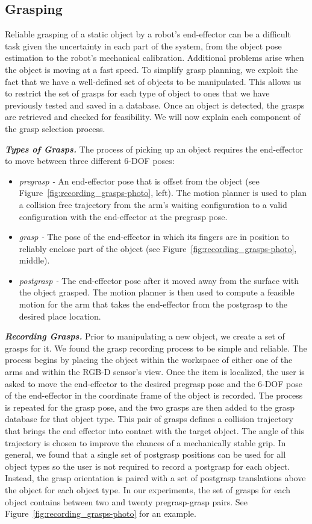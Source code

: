 \documentclass[letterpaper, 10 pt, conference]{ieeeconf}  %
\begin{document}
\subsection{Grasping}

Reliable grasping of a static object by a robot's end-effector can be
a difficult task given the uncertainty in each part of the system,
from the object pose estimation to the robot's mechanical
calibration. Additional problems arise when the object is moving at a
fast speed. To simplify grasp planning, we exploit the fact that we
have a well-defined set of objects to be manipulated. This allows us
to restrict the set of grasps for each type of object to ones that we
have previously tested and saved in a database. Once an object is
detected, the grasps are retrieved and checked for feasibility. We
will now explain each component of the grasp selection process.

\textit{\textbf{Types of Grasps.}}
The process of picking up an object requires the end-effector to move between three different 6-DOF poses:
\begin{itemize}
\item \textit{pregrasp -} An end-effector pose that is offset from the object (see Figure~\ref{fig:recording_grasps-photo}, left). The motion planner is used to plan a collision free trajectory from the arm's waiting configuration to a valid configuration with the end-effector at the pregrasp pose.
\item \textit{grasp -} The pose of the end-effector in which its fingers are in position to reliably enclose part of the object (see Figure~\ref{fig:recording_grasps-photo}, middle).
\item \textit{postgrasp -} The end-effector pose after it moved away from the surface with the object grasped. The motion planner is then used to compute a feasible motion for the arm that takes the end-effector from the postgrasp to the desired place location.
\end{itemize}

\textit{\textbf{Recording Grasps.}}  Prior to manipulating a new
object, we create a set of grasps for it. We found the grasp recording
process to be simple and reliable. The process begins by placing the
object within the workspace of either one of the arms and within the
RGB-D sensor's view. Once the item is localized, the user is asked to
move the end-effector to the desired pregrasp pose and the 6-DOF pose
of the end-effector in the coordinate frame of the object is
recorded. The process is repeated for the grasp pose, and the two
grasps are then added to the grasp database for that object type. This
pair of grasps defines a collision trajectory that brings the end
effector into contact with the target object. The angle of this
trajectory is chosen to improve the chances of a mechanically stable
grip. In general, we found that a single set of postgrasp positions
can be used for all object types so the user is not required to record
a postgrasp for each object.  Instead, the grasp orientation is paired
with a set of postgrasp translations above the object for each object
type. In our experiments, the set of grasps for each object contains
between two and twenty pregrasp-grasp pairs. See
Figure~\ref{fig:recording_grasps-photo} for an example.
\end{document}

